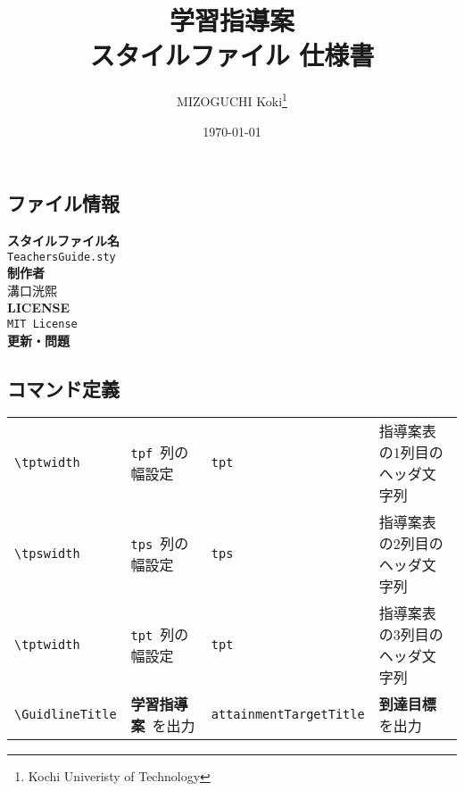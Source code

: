 \documentclass[paper=a4,fontsize=10.5pt]{jlreq}
\title{\textbf{学習指導案}\\ \LaTeXe スタイルファイル 仕様書}
\author{MIZOGUCHI Koki\thanks{Kochi Univeristy of Technology}}
\date{\today}
\begin{document}
\maketitle
\begin{leftbar}
    \section*{ファイル情報}
\end{leftbar}
\begin{framed}
    \begin{multicols}{2}
        \noindent\textbf{スタイルファイル名}\\
        \hspace{0.5em}\verb|TeachersGuide.sty|\\
        \textbf{制作者}\\
        \hspace{0.5em}溝口洸熙\\
        \newline
        \textbf{LICENSE}\\
        \hspace{0.5em}\verb|MIT License|\\
        \textbf{更新・問題}\\
    \end{multicols}
\end{framed}
\begin{leftbar}
    \section*{コマンド定義}
\end{leftbar}
\begin{table}[h]
    \begin{tabular}{ll|ll}
        \verb|\tptwidth|      & \verb|tpf|\ 列の幅設定      & \verb|tpt|                   & 指導案表の1列目のヘッダ文字列 \\
        \verb|\tpswidth|      & \verb|tps|\ 列の幅設定      & \verb|tps|                   & 指導案表の2列目のヘッダ文字列 \\
        \verb|\tptwidth|      & \verb|tpt|\ 列の幅設定      & \verb|tpt|                   & 指導案表の3列目のヘッダ文字列 \\
        \verb|\GuidlineTitle| & \textbf{学習指導案}\ を出力 & \verb|attainmentTargetTitle| & \textbf{到達目標} を出力      \\
    \end{tabular}
\end{table}
\end{document}
